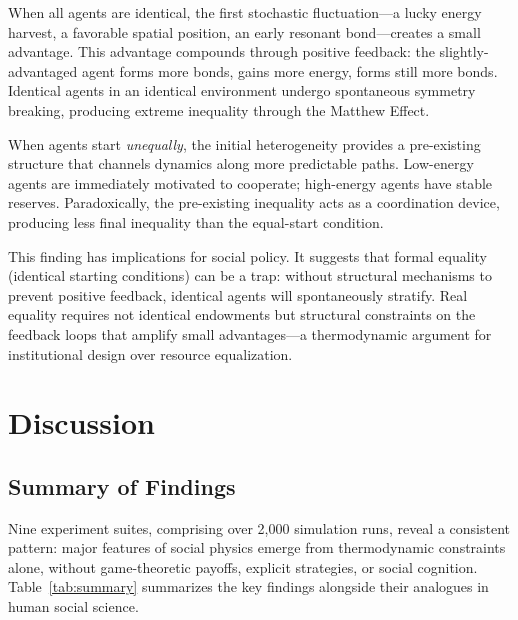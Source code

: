\documentclass[12pt,a4paper]{article}
\begin{document}
When all agents are identical, the first stochastic fluctuation---a lucky energy harvest, a favorable spatial position, an early resonant bond---creates a small advantage. This advantage compounds through positive feedback: the slightly-advantaged agent forms more bonds, gains more energy, forms still more bonds. Identical agents in an identical environment undergo spontaneous symmetry breaking, producing extreme inequality through the Matthew Effect.

When agents start \emph{unequally}, the initial heterogeneity provides a pre-existing structure that channels dynamics along more predictable paths. Low-energy agents are immediately motivated to cooperate; high-energy agents have stable reserves. Paradoxically, the pre-existing inequality acts as a coordination device, producing less final inequality than the equal-start condition.

This finding has implications for social policy. It suggests that formal equality (identical starting conditions) can be a trap: without structural mechanisms to prevent positive feedback, identical agents will spontaneously stratify. Real equality requires not identical endowments but structural constraints on the feedback loops that amplify small advantages---a thermodynamic argument for institutional design over resource equalization.

\section{Discussion}
\label{sec:discussion}

\subsection{Summary of Findings}

Nine experiment suites, comprising over 2{,}000 simulation runs, reveal a consistent pattern: major features of social physics emerge from thermodynamic constraints alone, without game-theoretic payoffs, explicit strategies, or social cognition. Table~\ref{tab:summary} summarizes the key findings alongside their analogues in human social science.
\end{document}
